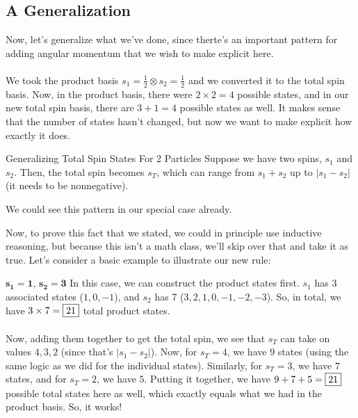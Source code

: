         \subsection{A Generalization}
            Now, let's generalize what we've done, since therte's an important pattern for adding angular momentum that we wish to make explicit here.\\\\
            We took the product basis $s_1 = \frac12 \otimes s_2 = \frac12$ and we converted it to the total spin basis. Now, in the product basis, there were $2\times2=4$ possible states, and in our new total spin basis, there are $3+1=4$ possible states as well. It makes sense that the number of states hasn't changed, but now we want to make explicit how exactly it does.
            \begin{theorem}{Generalizing Total Spin States For 2 Particles}{}
                Suppose we have two spins, $s_1$ and $s_2$. Then, the total spin becomes $s_T$, which can range from $s_1+s_2$ up to $|s_1 - s_2|$ (it needs to be nonnegative).
            \end{theorem}
            \begin{remark*}{}{}
                We could see this pattern in our special case already.
            \end{remark*}
            Now, to prove this fact that we stated, we could in principle use inductive reasoning, but because this isn't a math class, we'll skip over that and take it as true. Let's consider a basic example to illustrate our new rule:
            \begin{example}{$\mathbf{s_1 = 1}$, $\mathbf{s_2 = 3}$}{}
                In this case, we can construct the product states first. $s_1$ has 3 associated states ($1,0,-1$), and $s_2$ has 7 ($3,2,1,0,-1,-2,-3$). So, in total, we have $3\times 7 = \fbox{$21$}$ total product states.\\\\
                Now, adding them together to get the total spin, we see that $s_T$ can take on values $4,3,2$ (since that's $|s_1 - s_2|$). Now, for $s_T = 4$, we have $9$ states (using the same logic as we did for the individual states). Similarly, for $s_T=3$, we have $7$ states, and for $s_T=2$, we have $5$. Putting it together, we have $9+7+5=\fbox{$21$}$ possible total states here as well, which exactly equals what we had in the product basis. So, it works!
            \end{example}

